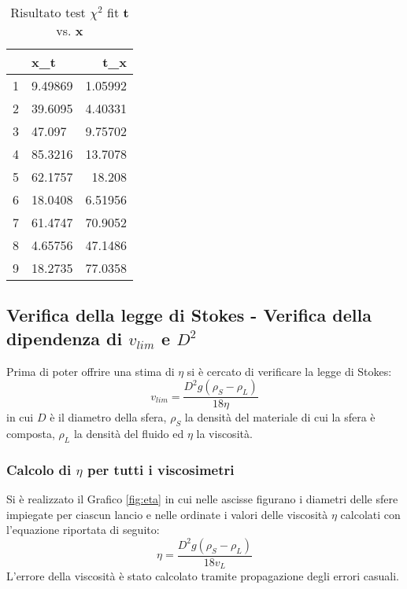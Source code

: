 \documentclass[a4paper,11pt,oneside]{article}
\begin{document}
\begin{table}[h!]
\centering
\begin{tabular}{|l|l|r|}
\hline
  & x\_t    & t\_x  \\ \hline
1 & 9.49869 & 1.05992       \\ \hline
2 & 39.6095 & 4.40331       \\ \hline
3 & 47.097  & 9.75702       \\ \hline
4 & 85.3216 & 13.7078       \\ \hline
5 & 62.1757 & 18.208  \\ \hline
6 & 18.0408 & 6.51956       \\ \hline
7 & 61.4747 & 70.9052       \\ \hline
8 & 4.65756 & 47.1486       \\ \hline
9 & 18.2735 & 77.0358       \\ \hline
\end{tabular}
\caption{Risultato test $\chi^2$ fit \textbf{t} vs. \textbf{x}}
\label{tab:test_chi_fit_x_t}
\end{table}


 



\subsection{Verifica della legge di Stokes - Verifica della dipendenza di $v_{lim}$ e $D^2$}
Prima di poter offrire una stima di $\eta$ si è cercato di verificare la legge di Stokes:
\begin{equation*}
    v_{lim}= \frac{{D}^2g\left(\rho_S - \rho_L\right)}{18 \eta }
\end{equation*}
in cui $D$ è il diametro della sfera, $\rho_S$ la densità del materiale di cui la sfera è composta, $\rho_L$ la densità del fluido ed $\eta$ la viscosità.

\subsubsection*{Calcolo di $\eta$ per tutti i viscosimetri}
Si è realizzato il Grafico \ref{fig:eta} in cui nelle ascisse figurano i diametri delle sfere impiegate per ciascun lancio e nelle ordinate i valori delle viscosità $\eta$ calcolati con l'equazione riportata di seguito:
\begin{equation*}
    \eta= \frac{{D}^2g\left(\rho_S - \rho_L\right)}{18 v_{L}} 
\end{equation*}
L'errore della viscosità è stato calcolato tramite propagazione degli errori casuali.
\end{document}
